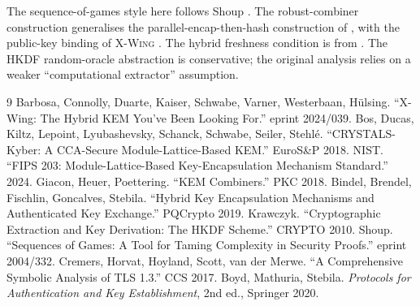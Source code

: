 \documentclass[11pt,a4paper]{article}
\theoremstyle{definition}
\theoremstyle{remark}
\newcommand{\xwing}{\textsc{X-Wing}}
\begin{document}
The sequence-of-games style here follows Shoup \cite{shoup2004games}.
The robust-combiner construction generalises the parallel-encap-then-hash
construction of \cite{giacon2018kem}, with the public-key binding of
\xwing{} \cite{xwing2024}. The hybrid freshness condition is from
\cite{bindel2019hybrid}. The HKDF random-oracle abstraction is conservative;
the original analysis \cite{krawczyk2010hkdf} relies on a weaker
``computational extractor'' assumption.

\begin{thebibliography}{9}
 Barbosa, Connolly, Duarte, Kaiser, Schwabe, Varner, Westerbaan, H{\"u}lsing.
``X-Wing: The Hybrid KEM You've Been Looking For.'' eprint 2024/039.
 Bos, Ducas, Kiltz, Lepoint, Lyubashevsky, Schanck, Schwabe, Seiler, Stehl{\'e}.
``CRYSTALS-Kyber: A CCA-Secure Module-Lattice-Based KEM.'' EuroS\&P 2018.
 NIST. ``FIPS 203: Module-Lattice-Based Key-Encapsulation Mechanism Standard.'' 2024.
 Giacon, Heuer, Poettering. ``KEM Combiners.'' PKC 2018.
 Bindel, Brendel, Fischlin, Goncalves, Stebila.
``Hybrid Key Encapsulation Mechanisms and Authenticated Key Exchange.'' PQCrypto 2019.
 Krawczyk. ``Cryptographic Extraction and Key Derivation: The HKDF Scheme.'' CRYPTO 2010.
 Shoup. ``Sequences of Games: A Tool for Taming Complexity in Security Proofs.'' eprint 2004/332.
 Cremers, Horvat, Hoyland, Scott, van der Merwe. ``A Comprehensive Symbolic Analysis of TLS 1.3.'' CCS 2017.
 Boyd, Mathuria, Stebila. \emph{Protocols for Authentication and Key Establishment}, 2nd ed., Springer 2020.
\end{thebibliography}
\end{document}
